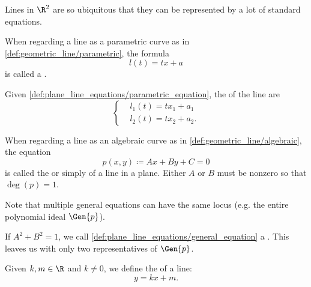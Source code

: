 \begin{definition}\label{def:plane_line_equations}
  Lines in \( \R^2 \) are so ubiquitous that they can be represented by a lot of standard equations.

  \begin{defenum}
     When regarding a line as a parametric curve as in \cref{def:geometric_line/parametric}, the formula
    \begin{equation}\label{def:plane_line_equations/parametric_equation}
      l(t) = tx + a
    \end{equation}
    is called a .

     Given \cref{def:plane_line_equations/parametric_equation}, the  of the line are
    \begin{equation}\label{def:plane_line_equations/scalar_parametric_equations}
      \begin{cases}
        &l_1(t) = t x_1 + a_1 \\
        &l_2(t) = t x_2 + a_2.
      \end{cases}
    \end{equation}

     When regarding a line as an algebraic curve as in \cref{def:geometric_line/algebraic}, the equation
    \begin{equation}\label{def:plane_line_equations/general_equation}
      p(x, y) \coloneqq Ax + By + C = 0
    \end{equation}
    is called the  or simply  of a line in a plane. Either \( A \) or \( B \) must be nonzero so that \( \deg(p) = 1 \).

    Note that multiple general equations can have the same locus (e.g. the entire polynomial ideal \( \Gen{p} \)).

     If \( A^2 + B^2 = 1 \), we call \cref{def:plane_line_equations/general_equation} a . This leaves us with only two representatives of \( \Gen{p} \).

     Given \( k, m \in \R \) and  \( k \neq 0 \), we define the  of a line:
    \begin{equation}\label{def:plane_line_equations/cartesian_equation}
      y = kx + m.
    \end{equation}


\end{defenum}
\end{definition}
